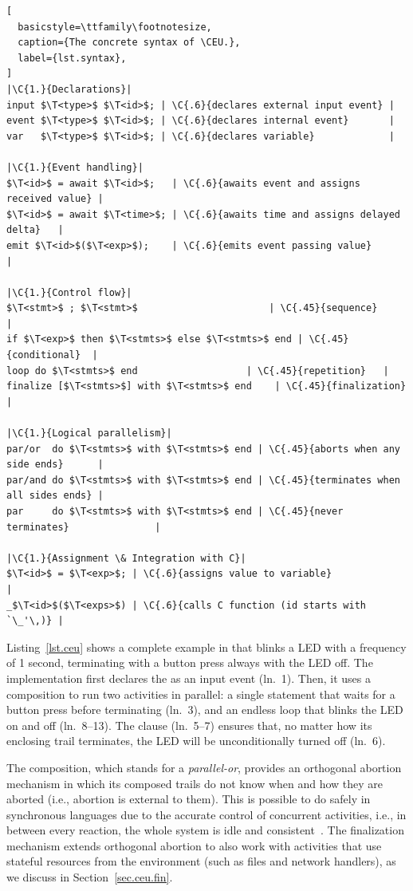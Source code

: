 \bgroup
\def\T<#1>{\langle\mathit{#1}\rangle}
\def\C#1#2{\hfill\rmfamily\itshape\makebox[#1\columnwidth][l]{//~#2}}
\begin{lstlisting}[
  basicstyle=\ttfamily\footnotesize,
  caption={The concrete syntax of \CEU.},
  label={lst.syntax},
]
|\C{1.}{Declarations}|
input $\T<type>$ $\T<id>$; | \C{.6}{declares external input event} |
event $\T<type>$ $\T<id>$; | \C{.6}{declares internal event}       |
var   $\T<type>$ $\T<id>$; | \C{.6}{declares variable}             |

|\C{1.}{Event handling}|
$\T<id>$ = await $\T<id>$;   | \C{.6}{awaits event and assigns received value} |
$\T<id>$ = await $\T<time>$; | \C{.6}{awaits time and assigns delayed delta}   |
emit $\T<id>$($\T<exp>$);    | \C{.6}{emits event passing value}               |

|\C{1.}{Control flow}|
$\T<stmt>$ ; $\T<stmt>$                       | \C{.45}{sequence}     |
if $\T<exp>$ then $\T<stmts>$ else $\T<stmts>$ end | \C{.45}{conditional}  |
loop do $\T<stmts>$ end                   | \C{.45}{repetition}   |
finalize [$\T<stmts>$] with $\T<stmts>$ end    | \C{.45}{finalization} |

|\C{1.}{Logical parallelism}|
par/or  do $\T<stmts>$ with $\T<stmts>$ end | \C{.45}{aborts when any side ends}      |
par/and do $\T<stmts>$ with $\T<stmts>$ end | \C{.45}{terminates when all sides ends} |
par     do $\T<stmts>$ with $\T<stmts>$ end | \C{.45}{never terminates}               |

|\C{1.}{Assignment \& Integration with C}|
$\T<id>$ = $\T<exp>$; | \C{.6}{assigns value to variable}                |
_$\T<id>$($\T<exps>$) | \C{.6}{calls C function (id starts with `\_'\,)} |
\end{lstlisting}
\egroup

Listing~\ref{lst.ceu} shows a complete example in \CEU that blinks a LED with a
frequency of 1 second, terminating with a button press always with the LED off.
%
The implementation first declares the  as an input event (ln.~1).
Then, it uses a  composition to run two activities in parallel:
a single statement that waits for a button press before terminating (ln.~3),
and an endless loop that blinks the LED on and off (ln.~8--13).
The  clause (ln.~5--7) ensures that, no matter how its enclosing
trail terminates, the LED will be unconditionally turned off (ln.~6).

The  composition, which stands for a \emph{parallel-or}, provides
an orthogonal abortion mechanism in which its composed trails do not know when
and how they are aborted (i.e., abortion is external to them).
%
This is possible to do safely in synchronous languages due to the accurate
control of concurrent activities, i.e., in between every reaction, the whole
system is idle and consistent~\cite{esterel.preemption}.
%
The finalization mechanism extends orthogonal abortion to also work with
activities that use stateful resources from the environment (such as files and
network handlers), as we discuss in Section~\ref{sec.ceu.fin}.
%


